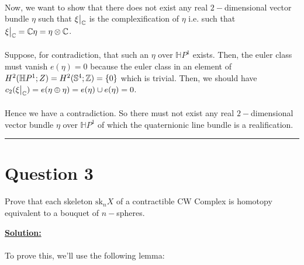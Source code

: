 \documentclass[11pt]{article}
\begin{document}
\\
Now, we want to show that there does not exist any real $2-$dimensional vector bundle $\eta$ such that $\restr{\xi}{\C}$ is the complexification of $\eta$ i.e. such that $ \restr{\xi}{\C} = \C \eta  = \eta \otimes \C$.
\\
\\
Suppose, for contradiction, that such an $\eta$ over $\mathbb{H}P^1$ exists. Then, the euler class must vanish $e(\eta) = 0$ because the euler class in an element of $H^2(\mathbb{H}P^1; Z) = H^2(\mathbb{S}^4; \mathbb{Z}) = \{0\}$ which is trivial. Then, we should have $c_2(\restr{\xi}{\C}) = e(\eta \oplus \eta) = e(\eta) \cup e(\eta) = 0$.\\
\\
Hence we have a contradiction. So there must not exist any real $2-$dimensional vector bundle $\eta$ over $\mathbb{H}P^1$ of which the quaternionic line bundle is a realification.



  



\vskip 0.5cm
\hrule
\pagebreak


\section{Question 3}
\begin{bluebox}
  Prove that each skeleton $\mathrm{sk}_n X$ of a contractible CW Complex is homotopy equivalent to a bouquet of $n-$spheres.
\end{bluebox}

\vskip 0.5cm
\textbf{\underline{Solution:}}
\\
\\
To prove this, we'll use the following lemma: 
\end{document}
